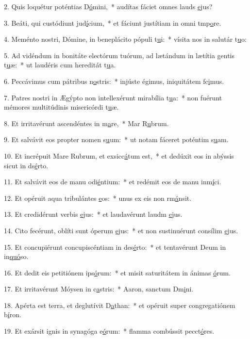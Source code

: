2. Quis loquétur poténtias D\uline{ó}mini,~* audítas fáciet omnes lauds \uline{e}jus?\par 
3. Beáti, qui custódiunt jud\uline{í}cium,~* et fáciunt justítiam in omni tmp\uline{o}re.\par 
4. Meménto nostri, Dómine, in beneplácito pópuli t\uline{u}i:~* vísita nos in salutár t\uline{u}o:\par 
5. Ad vidéndum in bonitáte electórum tuórum, ad lætándum in lætítia gentis t\uline{u}æ:~* ut laudéris cum hereditát t\uline{u}a.\par 
6. Peccávimus cum pátribus n\uline{o}stris:~* injúste égimus, iniquitátem fc\uline{i}mus.\par 
7. Patres nostri in Ægýpto non intellexérunt mirabília t\uline{u}a:~* non fuérunt mémores multitúdinis misericórdi t\uline{u}æ.\par 
8. Et irritavérunt ascendéntes in m\uline{a}re,~* Mar R\uline{u}brum.\par 
9. Et salvávit eos propter nomen s\uline{u}um:~* ut notam fáceret poténtim s\uline{u}am.\par 
10. Et incrépuit Mare Rubrum, et exsicc\uline{á}tum est,~* et dedúxit eos in abýssis sicut in ds\uline{é}rto.\par 
11. Et salvávit eos de manu odi\uline{é}ntium:~* et redémit eos de manu inm\uline{í}ci.\par 
12. Et opéruit aqua tribulántes \uline{e}os:~* unus ex eis non rm\uline{á}nsit.\par 
13. Et credidérunt verbis \uline{e}jus:~* et laudavérunt laudm \uline{e}jus.\par 
14. Cito fecérunt, oblíti sunt óperum \uline{e}jus:~* et non sustinuérunt consílim \uline{e}jus.\par 
15. Et concupiérunt concupiscéntiam in des\uline{é}rto:~* et tentavérunt Deum in in\uline{quó}so.\par 
16. Et dedit eis petitiónem ips\uline{ó}rum:~* et misit saturitátem in ánimas \uline{ó}rum.\par 
17. Et irritavérunt Móysen in c\uline{a}stris:~* Aaron, sanctum Dm\uline{i}ni.\par 
18. Apérta est terra, et deglutívit D\uline{a}than:~* et opéruit super congregatiónem b\uline{í}ron.\par 
19. Et exársit ignis in synagóga e\uline{ó}rum:~* flamma combússit pecct\uline{ó}res.\par 
